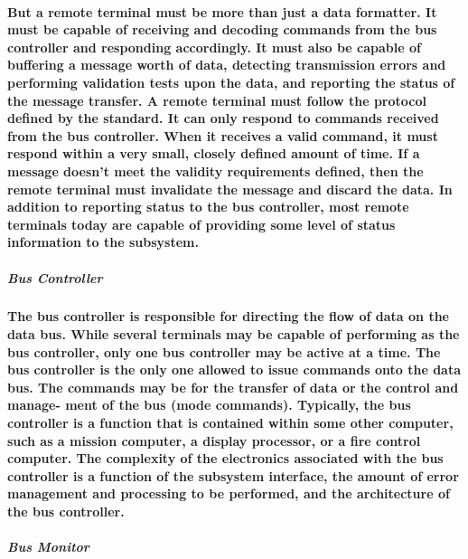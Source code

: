 \documentclass[12pt,a4paper]{report}
\begin{document}
\paragraph{\textrm{\textmd{But a remote terminal must be more than just a data formatter. It must be
capable of receiving and decoding commands from the bus controller and
responding accordingly. It must also be capable of buffering a message
worth of data, detecting transmission errors and performing validation tests upon the data, and reporting the status of the message transfer. 
A remote terminal must follow the protocol defined by the standard. It can
only respond to commands received from the bus controller. When it receives a valid command, it must respond
within a very small, closely defined amount of time. If a message doesn’t
meet the validity requirements defined, then the remote terminal must
invalidate the message and discard the data. In addition to reporting status to the bus controller, most
remote terminals today are capable of providing some level of status
information to the subsystem.}}}	
\subparagraph{Bus Controller}
\paragraph{\textrm{\textmd{The bus controller is responsible for directing the flow of data on the data
			bus. While several terminals may be capable of performing as the bus
			controller, only one bus controller may be active at a time. The bus
			controller is the only one allowed to issue commands onto the data bus.
			The commands may be for the transfer of data or the control and manage-
			ment of the bus (mode commands).
			Typically, the bus controller is a function that is contained within some
			other computer, such as a mission computer, a display processor, or a fire
			control computer. The complexity of the electronics associated with the
			bus controller is a function of the subsystem interface, the amount of error management and processing to be
			performed, and the architecture of the bus controller.}}}
\subparagraph{Bus Monitor}
\end{document}
